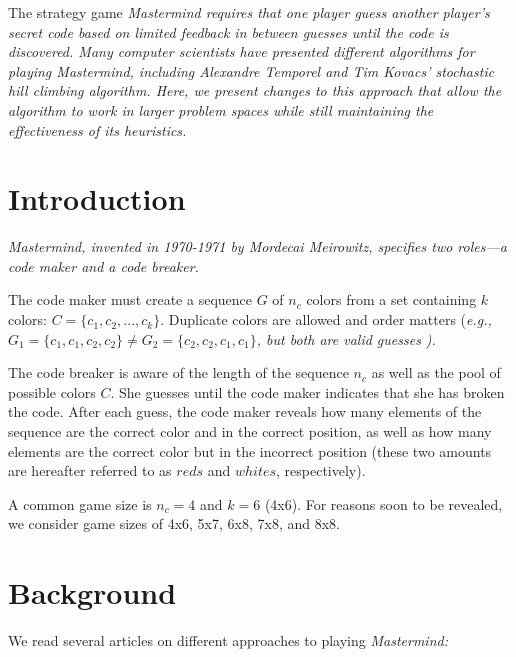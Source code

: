 \documentclass[11pt,twocolumn]{article}
\begin{document}
The strategy game \em Mastermind \rm requires that one player guess another player's secret code based on limited feedback in between guesses until the code is discovered. Many computer scientists have presented different algorithms for playing \em Mastermind\rm, including Alexandre Temporel and Tim Kovacs' stochastic hill climbing algorithm. Here, we present changes to this approach that allow the algorithm to work in larger problem spaces while still maintaining the effectiveness of its heuristics.

\section{Introduction}

\em Mastermind\rm, invented in 1970-1971 by Mordecai Meirowitz, specifies two roles---a code maker and a code breaker. 

The code maker must create a sequence $G$ of $n_c$ colors from a set containing $k$ colors: $C = \{ c_1, c_2, ..., c_{k} \}$. Duplicate colors are allowed and order matters (\em e.g.\rm, $G_1 = \{c_1, c_1, c_2, c_2\} \neq G_2 = \{ c_2, c_2, c_1, c_1\}$, but both are valid guesses ).

The code breaker is aware of the length of the sequence $n_c$ as well as the pool of possible colors $C$. She guesses until the code maker indicates that she has broken the code. After each guess, the code maker reveals how many elements of the sequence are the correct color and in the correct position, as well as how many elements are the correct color but in the incorrect position (these two amounts are hereafter referred to as $reds$ and $whites$, respectively). 

A common game size is $n_c = 4$ and $k = 6$ (4x6). For reasons soon to be revealed, we consider game sizes of 4x6, 5x7, 6x8, 7x8, and 8x8. 

\section{Background}

We read several articles on different approaches to playing \em Mastermind:\rm 
\end{document}
